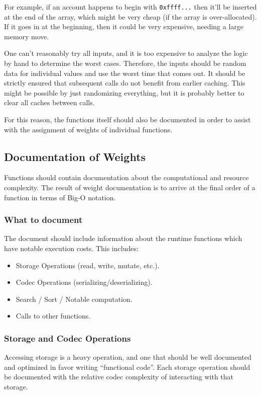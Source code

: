 \documentclass[11pt,a4paper]{article}
\begin{document}
For example, if an account happens to begin with \texttt{0xffff...} then it’ll be inserted at
the end of the array, which might be very cheap (if the array is over-allocated).
If it goes in at the beginning, then it could be very expensive, needing a large
memory move.
\newline
\newpage

One can’t reasonably try all inputs, and it is too expensive to analyze the logic by
hand to determine the worst cases. Therefore, the inputs should be random data for
individual values and use the worst time that comes out. It should be strictly ensured
that subsequent calls do not benefit from earlier caching. This might be possible by
just randomizing everything, but it is probably better to clear all caches between calls.
\newline

For this reason, the functions itself should also be documented in order to assist
with the assignment of weights of individual functions.

\subsection{Documentation of Weights}
Functions should contain documentation about the computational and resource complexity.
The result of weight documentation is to arrive at the final order of a function
in terms of Big-O notation.

\subsubsection{What to document}
The document should include information about the runtime functions which have notable
execution costs. This includes:

\begin{itemize}
\item Storage Operations (read, write, mutate, etc.).
\item Codec Operations (serializing/deserializing).
\item Search / Sort / Notable computation.
\item Calls to other functions.
\end{itemize}

\subsubsection{Storage and Codec Operations}
Accessing storage is a heavy operation, and one that should be well documented and
optimized in favor writing “functional code”. Each storage operation should be
documented with the relative codec complexity of interacting with that storage.
\newline
\end{document}
